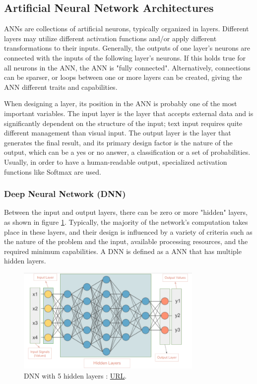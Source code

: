 \subsection{Artificial Neural Network Architectures}
ANNs are collections of artificial neurons, typically organized in layers. Different layers may utilize different activation functions and/or apply different transformations to their inputs. Generally, the outputs of one layer's neurons are connected with the inputs of the following layer's neurons. If this holds true for all neurons in the ANN, the ANN is "fully connected". Alternatively, connections can be sparser, or loops between one or more layers can be created, giving the ANN different traits and capabilities.

When designing a layer, its position in the ANN is probably one of the most important variables. The input layer is the layer that accepts external data and is significantly dependent on the structure of the input; text input requires quite different management than visual input. The output layer is the layer that generates the final result, and its primary design factor is the nature of the output, which can be a yes or no answer, a classification or a set of probabilities. Usually, in order to have a human-readable output, specialized activation functions like Softmax are used.

\subsubsection{Deep Neural Network (DNN)}
Between the input and output layers, there can be zero or more "hidden" layers, as shown in figure \ref{fig:Deep neural network}. Typically, the majority of the network's computation takes place in these layers, and their design is influenced by a variety of criteria such as the nature of the problem and the input, available processing resources, and the required minimum capabilities. A DNN is defined as a ANN that has multiple hidden layers.\cite{IBM_Neural_Networks}
\begin{figure}[H]
    \centering
        \includegraphics[width=0.8\textwidth]{Images/ANNArchitectures/dnn.png}
        \decoRule
        \caption[Deep neural network]{DNN with 5 hidden layers \cite{hidden_layers}: \href{http://www.gabormelli.com/RKB/Multi_Hidden-Layer_(Deep)_Neural_Network}{URL}.}
        \label{fig:Deep neural network}
\end{figure}


